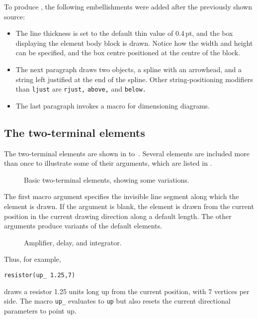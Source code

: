 To produce , the following embellishments
were added after the previously shown source:
{\small  }

\begin{itemize}
\item The line thickness is set to the default thin value of \hbox{0.4\,pt},
   and the box displaying the element body block is drawn.  Notice how the
   width and height can be specified, and the box centre positioned at
   the centre of the block.
\item The next paragraph draws two objects, a spline with an arrowhead,
   and a string left justified at the end of the spline.  Other
   string-positioning modifiers than {\tt ljust} are {\tt rjust,}
   {\tt above,} and {\tt below.}

\item The last paragraph invokes a macro for dimensioning diagrams.
   \end{itemize}

\subsection{The two-terminal elements\label{Twoterminal:}}
The two-terminal elements are shown in 
to~.
Several elements are included more than once to illustrate
some of their arguments, which are listed in .
\enlargethispage{\baselineskip}
\begin{figure}[h!]
   
   \caption{Basic two-terminal elements, showing some variations.}
   \label{CctTable}
    \end{figure}

The first macro argument specifies
the invisible line segment along which the element is drawn.
If the argument is blank,
the element is drawn from the current position in the current drawing
direction along a default length.
The other arguments produce variants of the default elements.
\begin{figure}[hbt]
   
   \caption{Amplifier, delay, and integrator.}
   \label{AmpTable}
   \end{figure}

Thus, for example,
\par
{\tt resistor(up\_ 1.25,7)}
\par
\noindent%
draws a resistor 1.25 units long up from the current position, with $7$
vertices per side.
The macro {\tt up\_} evaluates to {\tt up} but also resets the current
directional parameters to point up.

